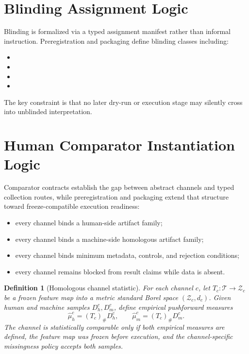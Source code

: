 \documentclass[11pt,a4paper]{article}
\newtheorem{definition}[theorem]{Definition}
\begin{document}
\section{Blinding Assignment Logic}

Blinding is formalized via a typed assignment manifest rather than informal instruction. Preregistration and packaging define blinding classes including:

\begin{itemize}
\item \texttt{\allowbreak{}}
\item \texttt{\allowbreak{}}
\item \texttt{\allowbreak{}\allowbreak{}}
\item \texttt{\allowbreak{}\allowbreak{}\allowbreak{}\allowbreak{}}
\end{itemize}

The key constraint is that no later dry-run or execution stage may silently
cross into unblinded interpretation.

\section{Human Comparator Instantiation Logic}

Comparator contracts establish the gap between abstract channels and typed collection routes, while preregistration and packaging extend that structure toward freeze-compatible execution readiness:

\begin{itemize}
\item every channel binds a human-side artifact family;
\item every channel binds a machine-side homologous artifact family;
\item every channel binds minimum metadata, controls, and rejection conditions;
\item every channel remains blocked from result claims while data is absent.
\end{itemize}

\begin{definition}[Homologous channel statistic]
For each channel $c$, let $T_c:\mathcal{T}\to\mathcal{Z}_c$ be a frozen
feature map into a metric standard Borel space $(\mathcal{Z}_c,d_c)$. Given
human and machine samples $D_h^c,D_m^c$, define empirical pushforward measures
\[
\widehat{\mu}_h^c=(T_c)_{\#}D_h^c,\qquad
\widehat{\mu}_m^c=(T_c)_{\#}D_m^c.
\]
The channel is statistically comparable only if both empirical measures are
defined, the feature map was frozen before execution, and the channel-specific
missingness policy accepts both samples.
\end{definition}
\end{document}
